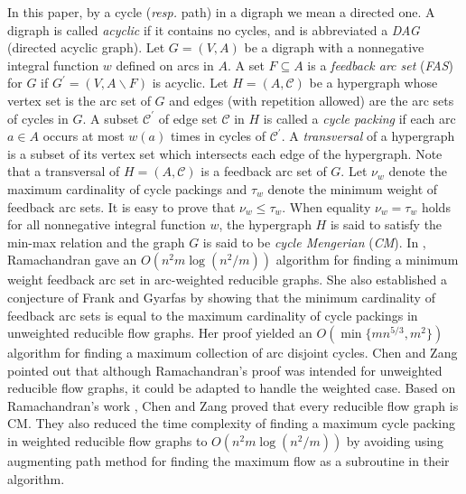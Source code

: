 \documentclass[11pt]{article}
\begin{document}
In this paper, by a cycle (\emph{resp.} path) in a digraph we mean a directed one. A digraph is called \emph{acyclic} if it contains no cycles, and is abbreviated a \emph{DAG} (directed acyclic graph). Let $G=(V,A)$ be a digraph with a nonnegative integral function $w$ defined on arcs in $A$. A set $F\subseteq A$ is a \emph{feedback arc set} (\emph{FAS}) for $G$ if $G^\prime=(V,A\backslash F)$ is acyclic. Let $H=(A,\mathcal{C})$ be a hypergraph whose vertex set is the arc set of $G$ and edges (with repetition allowed) are the arc sets of cycles in $G$. A subset $\mathcal{C}^\prime$ of edge set $\mathcal{C}$ in $H$ is called a \emph{cycle packing} if each arc $a\in A$ occurs at most $w(a)$ times in cycles of $\mathcal{C}^\prime$. A \emph{transversal} of a hypergraph is a subset of its vertex set which intersects each edge of the hypergraph. Note that a transversal of $H=(A,\mathcal{C})$ is a feedback arc set of $G$. Let $\nu_w$ denote the maximum cardinality of cycle packings and $\tau_w$ denote the minimum weight of feedback arc sets. It is easy to prove that $\nu_w\leq\tau_w$. When equality $\nu_w=\tau_w$ holds for all nonnegative integral function $w$, the hypergraph $H$ is said to satisfy the min-max relation and the graph $G$ is said to be \emph{cycle Mengerian} (\emph{CM}). In \cite{Rama1}, Ramachandran gave an $O(n^2m\log(n^2 / m))$ algorithm for finding a minimum weight feedback arc set in arc-weighted reducible graphs. She \cite{Rama2} also established a conjecture of Frank and Gyarfas \cite{FraG} by showing that the minimum cardinality of feedback arc sets is equal to the maximum cardinality of cycle packings  in unweighted reducible flow graphs. Her proof yielded an $O(\min\{mn^{5/3},m^2\})$ algorithm for finding a maximum collection of arc disjoint cycles. Chen and Zang \cite{CheZ} pointed out that although Ramachandran's proof \cite{Rama2} was intended for unweighted reducible flow graphs, it could be adapted to handle the weighted case. Based on Ramachandran's work \cite{Rama1,Rama2}, Chen and Zang proved that every reducible flow graph is CM. They also reduced the time complexity of finding a maximum cycle packing in weighted reducible flow graphs to $O(n^2 m\log(n^2/m))$  by avoiding using augmenting path method for finding the maximum flow as a subroutine in their algorithm. 
\end{document}
